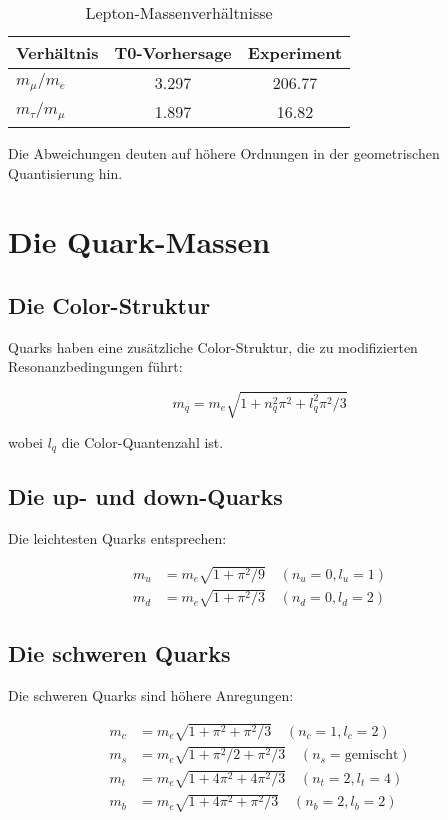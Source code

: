 \documentclass[12pt,a4paper]{report}
\begin{document}
	\begin{table}[htbp]
		\centering
		\begin{tabular}{lcc}
			\toprule
			Verhältnis & T0-Vorhersage & Experiment \\
			\midrule
			$m_\mu/m_e$ & 3.297 & 206.77 \\
			$m_\tau/m_\mu$ & 1.897 & 16.82 \\
			\bottomrule
		\end{tabular}
		\caption{Lepton-Massenverhältnisse}
	\end{table}
	
	Die Abweichungen deuten auf höhere Ordnungen in der geometrischen Quantisierung hin.
	
	\section{Die Quark-Massen}
	
	\subsection{Die Color-Struktur}
	
	Quarks haben eine zusätzliche Color-Struktur, die zu modifizierten Resonanzbedingungen führt:
	
	\begin{equation}
		m_q = m_e \sqrt{1 + n_q^2\pi^2 + l_q^2\pi^2/3}
	\end{equation}
	
	wobei $l_q$ die Color-Quantenzahl ist.
	
	\subsection{Die up- und down-Quarks}
	
	Die leichtesten Quarks entsprechen:
	
	\begin{align}
		m_u &= m_e \sqrt{1 + \pi^2/9} \quad (n_u = 0, l_u = 1) \\
		m_d &= m_e \sqrt{1 + \pi^2/3} \quad (n_d = 0, l_d = 2)
	\end{align}
	
	\subsection{Die schweren Quarks}
	
	Die schweren Quarks sind höhere Anregungen:
	
	\begin{align}
		m_c &= m_e \sqrt{1 + \pi^2 + \pi^2/3} \quad (n_c = 1, l_c = 2) \\
		m_s &= m_e \sqrt{1 + \pi^2/2 + \pi^2/3} \quad (n_s = \text{gemischt}) \\
		m_t &= m_e \sqrt{1 + 4\pi^2 + 4\pi^2/3} \quad (n_t = 2, l_t = 4) \\
		m_b &= m_e \sqrt{1 + 4\pi^2 + \pi^2/3} \quad (n_b = 2, l_b = 2)
	\end{align}
	
\end{document}

